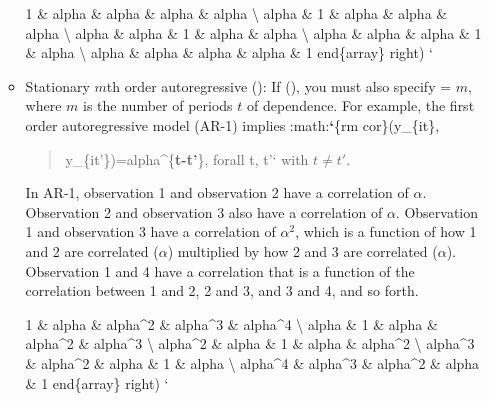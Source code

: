\documentclass[letterpaper,10pt,english]{sphinxmanual}
\begin{document}
\begin{itemize}
\begin{itemize}

1 \& alpha \& alpha \& alpha \& alpha \textbackslash{}
alpha \& 1 \& alpha \& alpha \& alpha \textbackslash{}
alpha \& alpha \& 1 \& alpha \& alpha \textbackslash{}
alpha \& alpha \& alpha \& 1 \& alpha \textbackslash{}
alpha \& alpha \& alpha \& alpha \& 1
end\{array\} right) {}`

\item {} 
Stationary \(m\)th order autoregressive ():
If (), you must also specify  = \(m\),
where \(m\) is the number of periods \(t\) of dependence.
For example, the first order autoregressive model (AR-1) implies
:math:{\color{red}\bfseries{}{}`}\{rm cor\}(y\_\{it\},
\begin{quote}

y\_\{it'\})=alpha\textasciicircum{}\{{\color{red}\bfseries{}\textbar{}t-t'\textbar{}}\}, forall t, t'{}` with \(t\ne t'\).
\end{quote}

In AR-1, observation 1 and observation 2 have a correlation of
\(\alpha\). Observation 2 and observation 3 also have a
correlation of \(\alpha\). Observation 1 and observation 3
have a correlation of \(\alpha^2\), which is a function of how
1 and 2 are correlated (\(\alpha\)) multiplied by how 2 and 3
are correlated (\(\alpha\)). Observation 1 and 4 have a
correlation that is a function of the correlation between 1 and 2,
2 and 3, and 3 and 4, and so forth.


1 \& alpha \& alpha\textasciicircum{}2 \& alpha\textasciicircum{}3 \& alpha\textasciicircum{}4 \textbackslash{}
alpha \& 1 \& alpha \& alpha\textasciicircum{}2 \& alpha\textasciicircum{}3 \textbackslash{}
alpha\textasciicircum{}2 \& alpha \& 1 \& alpha \& alpha\textasciicircum{}2 \textbackslash{}
alpha\textasciicircum{}3 \& alpha\textasciicircum{}2 \& alpha \& 1 \& alpha \textbackslash{}
alpha\textasciicircum{}4 \& alpha\textasciicircum{}3 \& alpha\textasciicircum{}2 \& alpha \& 1
end\{array\} right) {}`


\end{itemize}
\end{itemize}
\end{document}
